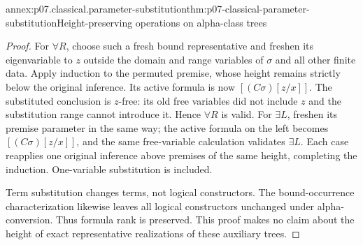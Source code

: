 \begin{annexitem}{annex:p07.classical.parameter-substitution}{thm:p07-classical-parameter-substitution}{Height-preserving operations on alpha-class trees}
\begin{proof}
For \(\forall R\), choose such a fresh bound representative and freshen
its eigenvariable to \(z\) outside the domain and range variables of
\(\sigma\) and all other finite data. Apply induction to the permuted
premise, whose height remains strictly below the original inference.
Its active formula is now \([(C\sigma)[z/x]]\). The substituted
conclusion is \(z\)-free: its old free variables did not include \(z\)
and the substitution range cannot introduce it. Hence \(\forall R\)
is valid. For \(\exists L\), freshen its premise parameter in the same
way; the active formula on the left becomes \([(C\sigma)[z/x]]\),
and the same free-variable calculation validates \(\exists L\).
Each case reapplies one original inference above premises of the same
height, completing the induction. One-variable substitution is included.

Term substitution changes terms, not logical constructors. The
bound-occurrence characterization likewise leaves all logical constructors
unchanged under alpha-conversion. Thus formula rank is preserved.
This proof makes no claim about the height of exact representative
realizations of these auxiliary trees.
\end{proof}
\end{annexitem}

